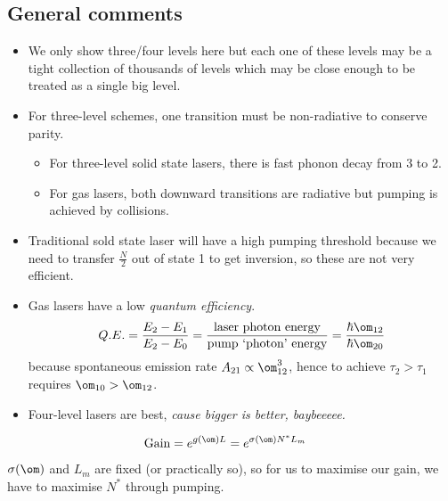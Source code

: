 \documentclass[a4paper, 11pt, normalem]{report}
\begin{document}
\subsection{General comments}
\begin{itemize}
    \item We only show three/four levels here but each one of these levels may be a tight collection of thousands of levels which may be close enough to be treated as a single big level.
    \item For three-level schemes, one transition must be non-radiative to conserve parity.
        \begin{itemize}
            \item For three-level solid state lasers, there is fast phonon decay from 3 to 2.
            \item For gas lasers, both downward transitions are radiative but pumping is achieved by collisions.
        \end{itemize}
    \item Traditional sold state laser will have a high pumping threshold because we need to transfer $\frac{N}{2}$ out of state 1 to get inversion, so these are not very efficient.
    \item Gas lasers have a low \emph{quantum efficiency}.
        \begin{equation}
            Q.E. = \frac{E_2-E_1}{E_2-E_0} = \frac{\text{laser photon energy}}{\text{pump `photon' energy}} = \frac{\hbar\om_{12}}{\hbar\om_{20}}
        \end{equation}
        because spontaneous emission rate $A_{21}\propto\om_{12}^3$, hence to achieve $\tau_2>\tau_1$ requires $\om_{10}>\om_{12}$.
    \item Four-level lasers are best, \emph{cause bigger is better, baybeeeee.}
\end{itemize}
\begin{align}
    \text{Gain} &= e^{g(\om)L} = e^{\sigma(\om)N^*L_m}
\end{align}
$\sigma(\om)$ and $L_m$ are fixed (or practically so), so for us to maximise our gain, we have to maximise $N^*$ through pumping.
\end{document}
